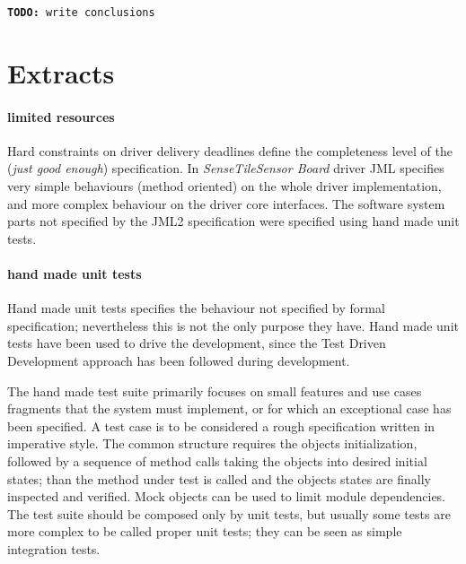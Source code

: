 \documentclass[english]{lni}
\newcommand{\todo}[1]{\texttt{\textbf{TODO:} #1}}
\newcommand{\ST}{\emph{SenseTile}\xspace}
\newcommand{\SB}{\emph{Sensor Board}\xspace}
\newcommand{\STSB}{\ST \SB\xspace}
\begin{document}
\todo{write conclusions}

% 
% 


\newpage 

\section{Extracts}

\paragraph*{limited resources}

Hard constraints on driver delivery deadlines define the completeness level of the (\emph{just good enough}) specification.  
In \STSB driver JML specifies very simple behaviours (method oriented) on the whole driver implementation, and more complex behaviour on the driver core interfaces.  
The software system parts not specified by the JML2 specification were specified using hand made unit tests.

\paragraph*{hand made unit tests}

Hand made unit tests specifies the behaviour not specified by formal specification; nevertheless this is not the only purpose they have.
Hand made unit tests have been used to drive the development, since the Test Driven Development approach\cite{Beck2003} has been
followed during development.

The hand made test suite primarily focuses on small features and use cases fragments that the system must implement, or for which an exceptional case has been specified. 
A test case is to be considered a rough specification written in imperative style. 
The common structure requires the objects initialization, followed by a sequence of method calls taking the objects into desired initial states; than the method under test is called and the objects states are finally inspected and verified. 
Mock objects can be used to limit module dependencies. 
The test suite should be composed only by unit tests, but usually some tests are more complex to be called proper unit tests; they can be seen as simple integration tests.
\end{document}
